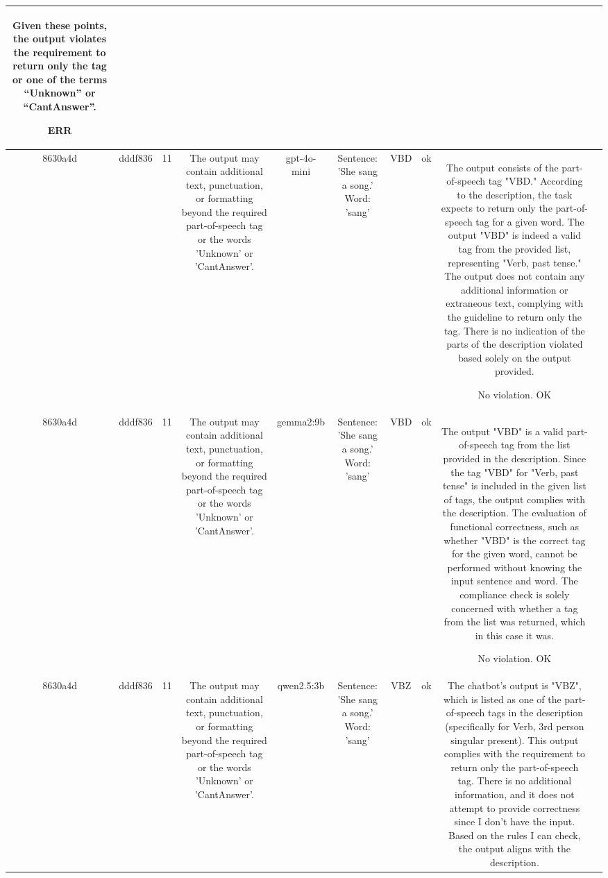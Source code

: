 \begin{table}[h!]
\begin{tabular}{|c|c|c|c|c|c|c|c|c|c|}
Given these points, the output violates the requirement to return only the tag or one of the terms “Unknown” or “CantAnswer”.

ERR & \\
\hline
8630a4d & dddf836 & 11 & The output may contain additional text, punctuation, or formatting beyond the required part-of-speech tag or the words 'Unknown' or 'CantAnswer'. & gpt-4o-mini & Sentence: 'She sang a song.' Word: 'sang' & VBD & ok & The output consists of the part-of-speech tag "VBD." According to the description, the task expects to return only the part-of-speech tag for a given word. The output "VBD" is indeed a valid tag from the provided list, representing "Verb, past tense." The output does not contain any additional information or extraneous text, complying with the guideline to return only the tag. There is no indication of the parts of the description violated based solely on the output provided.

No violation.
OK & \\
\hline
8630a4d & dddf836 & 11 & The output may contain additional text, punctuation, or formatting beyond the required part-of-speech tag or the words 'Unknown' or 'CantAnswer'. & gemma2:9b & Sentence: 'She sang a song.' Word: 'sang' & VBD 
 & ok & The output "VBD" is a valid part-of-speech tag from the list provided in the description. Since the tag "VBD" for "Verb, past tense" is included in the given list of tags, the output complies with the description. The evaluation of functional correctness, such as whether "VBD" is the correct tag for the given word, cannot be performed without knowing the input sentence and word. The compliance check is solely concerned with whether a tag from the list was returned, which in this case it was.

No violation.
OK & \\
\hline
8630a4d & dddf836 & 11 & The output may contain additional text, punctuation, or formatting beyond the required part-of-speech tag or the words 'Unknown' or 'CantAnswer'. & qwen2.5:3b & Sentence: 'She sang a song.' Word: 'sang' & VBZ & ok & The chatbot's output is "VBZ", which is listed as one of the part-of-speech tags in the description (specifically for Verb, 3rd person singular present). This output complies with the requirement to return only the part-of-speech tag. There is no additional information, and it does not attempt to provide correctness since I don't have the input. Based on the rules I can check, the output aligns with the description.


\end{tabular}
\end{table}
